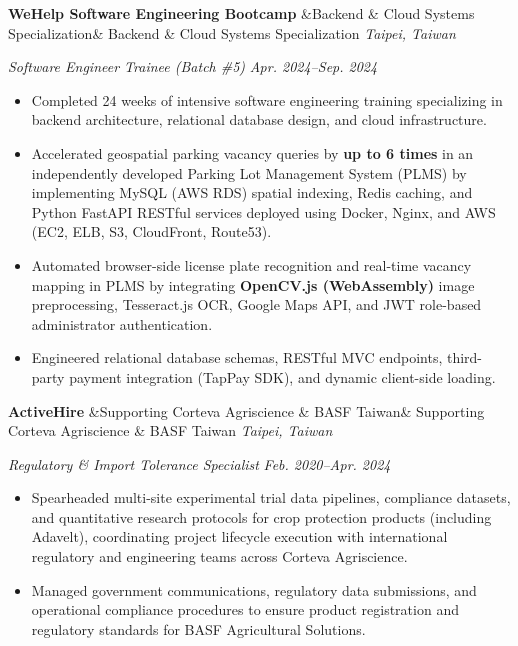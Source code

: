 \documentclass[10pt,a4paper]{article}
\newcommand{\entryheader}[3]{%
  \noindent%
  \textbf{\color{maindark}#1}%
  \ifx&#2&%
  \else%
    { \small\color{subgray}#2}%
  \fi%
  \hfill%
  \textit{\color{locationcoral}#3}\par%
}
\newcommand{\entrysubheader}[2]{%
  \noindent%
  \textit{\color{subgray}#1}%
  \hfill%
  \textit{\color{subgray}#2}\par%
  \vspace{1.5pt}%
}
\begin{document}
\vspace{3pt}

\entryheader{WeHelp Software Engineering Bootcamp}{Backend \& Cloud Systems Specialization}{Taipei, Taiwan}
\entrysubheader{Software Engineer Trainee (Batch \#5)}{Apr. 2024--Sep. 2024}
\begin{itemize}
    \item {Completed 24 weeks of intensive software engineering training specializing in backend architecture, relational database design, and cloud infrastructure.}
    \item {Accelerated geospatial parking vacancy queries by \textbf{up to 6 times} in an independently developed Parking Lot Management System (PLMS) by implementing MySQL (AWS RDS) spatial indexing, Redis caching, and Python FastAPI RESTful services deployed using Docker, Nginx, and AWS (EC2, ELB, S3, CloudFront, Route53).}
    \item {Automated browser-side license plate recognition and real-time vacancy mapping in PLMS by integrating \textbf{OpenCV.js (WebAssembly)} image preprocessing, Tesseract.js OCR, Google Maps API, and JWT role-based administrator authentication.}
    \item {Engineered relational database schemas, RESTful MVC endpoints, third-party payment integration (TapPay SDK), and dynamic client-side loading.}
\end{itemize}

\vspace{3pt}

\entryheader{ActiveHire}{Supporting Corteva Agriscience \& BASF Taiwan}{Taipei, Taiwan}
\entrysubheader{Regulatory \& Import Tolerance Specialist}{Feb. 2020--Apr. 2024}
\begin{itemize}
    \item {Spearheaded multi-site experimental trial data pipelines, compliance datasets, and quantitative research protocols for crop protection products (including Adavelt\texttrademark{}), coordinating project lifecycle execution with international regulatory and engineering teams across Corteva Agriscience.}
    \item {Managed government communications, regulatory data submissions, and operational compliance procedures to ensure product registration and regulatory standards for BASF Agricultural Solutions.}
\end{itemize}

\vspace{3pt}
\end{document}
